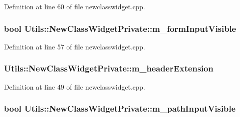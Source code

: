 Definition at line 60 of file newclasswidget.\-cpp.

\hypertarget{struct_utils_1_1_new_class_widget_private_a485151d4b70e4b735b1cd8b395f47163}{
\subsubsection[{m\-\_\-form\-Input\-Visible}]{\setlength{\rightskip}{0pt plus 5cm}bool Utils\-::\-New\-Class\-Widget\-Private\-::m\-\_\-form\-Input\-Visible}}\label{struct_utils_1_1_new_class_widget_private_a485151d4b70e4b735b1cd8b395f47163}


Definition at line 57 of file newclasswidget.\-cpp.

\hypertarget{struct_utils_1_1_new_class_widget_private_aa2c6dc307213250a01848e1b0948e9ce}{
\subsubsection[{m\-\_\-header\-Extension}]{ Utils\-::\-New\-Class\-Widget\-Private\-::m\-\_\-header\-Extension}}\label{struct_utils_1_1_new_class_widget_private_aa2c6dc307213250a01848e1b0948e9ce}


Definition at line 49 of file newclasswidget.\-cpp.

\hypertarget{struct_utils_1_1_new_class_widget_private_a413581a7a468f2da3849013b63932487}{
\subsubsection[{m\-\_\-path\-Input\-Visible}]{\setlength{\rightskip}{0pt plus 5cm}bool Utils\-::\-New\-Class\-Widget\-Private\-::m\-\_\-path\-Input\-Visible}}\label{struct_utils_1_1_new_class_widget_private_a413581a7a468f2da3849013b63932487}


